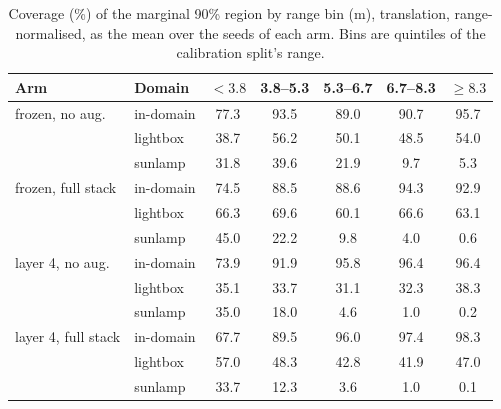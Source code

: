 \begin{table}[ht]
  \caption{Coverage (\%) of the marginal 90\% region by range bin (m), translation, range-normalised, as the mean over the seeds of each arm. Bins are quintiles of the calibration split's range.}
  \label{tab:rangebins-translation-relative}
  \centering
  \scriptsize
  \setlength{\tabcolsep}{4pt}
  \begin{tabular}{l l ccccc}
    \toprule
    Arm & Domain & $<3.8$ & 3.8--5.3 & 5.3--6.7 & 6.7--8.3 & $\geq8.3$ \\
    \midrule
    frozen, no aug. & in-domain & 77.3 & 93.5 & 89.0 & 90.7 & 95.7 \\
     & lightbox & 38.7 & 56.2 & 50.1 & 48.5 & 54.0 \\
     & sunlamp & 31.8 & 39.6 & 21.9 & 9.7 & 5.3 \\
    \midrule
    frozen, full stack & in-domain & 74.5 & 88.5 & 88.6 & 94.3 & 92.9 \\
     & lightbox & 66.3 & 69.6 & 60.1 & 66.6 & 63.1 \\
     & sunlamp & 45.0 & 22.2 & 9.8 & 4.0 & 0.6 \\
    \midrule
    layer 4, no aug. & in-domain & 73.9 & 91.9 & 95.8 & 96.4 & 96.4 \\
     & lightbox & 35.1 & 33.7 & 31.1 & 32.3 & 38.3 \\
     & sunlamp & 35.0 & 18.0 & 4.6 & 1.0 & 0.2 \\
    \midrule
    layer 4, full stack & in-domain & 67.7 & 89.5 & 96.0 & 97.4 & 98.3 \\
     & lightbox & 57.0 & 48.3 & 42.8 & 41.9 & 47.0 \\
     & sunlamp & 33.7 & 12.3 & 3.6 & 1.0 & 0.1 \\
    \bottomrule
  \end{tabular}
\end{table}
